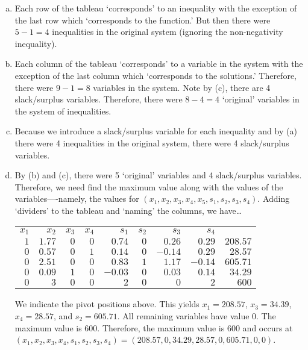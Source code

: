 \documentclass[11pt,letterpaper]{article}
\begin{document}
\sol 
\begin{enumerate}[(a)]
\item Each row of the tableau `corresponds' to an inequality with the exception of the last row which `corresponds to the function.' But then there were $5 - 1= 4$ inequalities in the original system (ignoring the non-negativity inequality). \pspace

\item Each column of the tableau `corresponds' to a variable in the system with the exception of the last column which `corresponds to the solutions.' Therefore, there were $9 - 1= 8$ variables in the system. Note by (c), there are 4 slack/surplus variables. Therefore, there were $8 - 4= 4$ `original' variables in the system of inequalities. \pspace

\item Because we introduce a slack/surplus variable for each inequality and by (a) there were 4 inequalities in the original system, there were 4 slack/surplus variables. \pspace

\item By (b) and (c), there were 5 `original' variables and 4 slack/surplus variables. Therefore, we need find the maximum value along with the values of the variables----namely, the values for $(x_1, x_2, x_3, x_4, x_5, s_1, s_2, s_3, s_4)$. Adding `dividers' to the tableau and `naming' the columns, we have\dots \par
	\begin{table}[!ht]
	\centering
	\begin{tabular}{rrrrrrrr|r}
	{\small $x_1$} & {\small $x_2$} & {\small $x_3$} & {\small $x_4$} & {\small $s_1$} & {\small $s_2$} & {\small $s_3$} & {\small $s_4$} & \\
	$\boxed{1}$ & $1.77$ & $0$ & $0$ & $0.74$ & $0$ & $0.26$ & $0.29$ & $208.57$ \\
	$0$ & $0.57$ & $0$ & $\boxed{1}$ & $0.14$ & $0$ & $-0.14$ & $0.29$ & $28.57$ \\
	$0$ & $2.51$ & $0$ & $0$ & $0.83$ & $\boxed{1}$ & $1.17$ & $-0.14$ & $605.71$ \\
	$0$ & $0.09$ & $\boxed{1}$ & $0$ & $-0.03$ & $0$ & $0.03$ & $0.14$ & $34.29$ \\ \hline
	$0$ & $3$ & $0$& $0$& $2$ & $0$ & $0$ & $2$ & $600$
	\end{tabular}
	\end{table} \par
We indicate the pivot positions above. This yields $x_1= 208.57$, $x_3= 34.39$, $x_4= 28.57$, and $s_2= 605.71$. All remaining variables have value 0. The maximum value is $600$. Therefore, the maximum value is $600$ and occurs at $(x_1, x_2, x_3, x_4, s_1, s_2, s_3, s_4)= (208.57, 0, 34.29, 28.57, 0, 605.71, 0, 0)$. 
\end{enumerate} 
\end{document}
